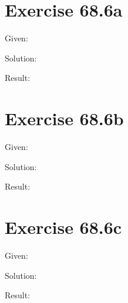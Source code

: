 \documentclass[a4paper, 10pt]{scrartcl}
\begin{document}
\section{Exercise 68.6a}

Given:

Solution:

Result:

\section{Exercise 68.6b}

Given:

Solution:

Result:

\section{Exercise 68.6c}

Given:

Solution:

Result:
\end{document}
